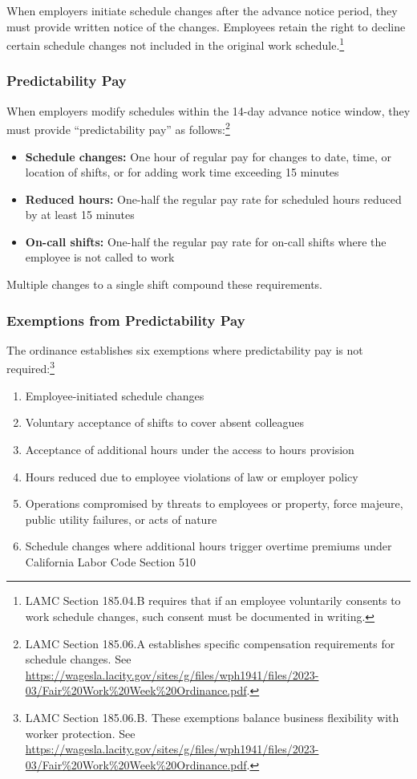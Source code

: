\documentclass[letterpaper,11pt,leqno]{article}
\theoremstyle{paper}
\begin{document}
When employers initiate schedule changes after the advance notice period, they must provide written notice of the changes. Employees retain the right to decline certain schedule changes not included in the original work schedule.\footnote{LAMC Section 185.04.B requires that if an employee voluntarily consents to work schedule changes, such consent must be documented in writing.}

\subsubsection{Predictability Pay}
When employers modify schedules within the 14-day advance notice window, they must provide ``predictability pay'' as follows:\footnote{LAMC Section 185.06.A establishes specific compensation requirements for schedule changes. See \url{https://wagesla.lacity.gov/sites/g/files/wph1941/files/2023-03/Fair\%20Work\%20Week\%20Ordinance.pdf}.}
\begin{itemize}
   \item \textbf{Schedule changes:} One hour of regular pay for changes to date, time, or location of shifts, or for adding work time exceeding 15 minutes
   \item \textbf{Reduced hours:} One-half the regular pay rate for scheduled hours reduced by at least 15 minutes
   \item \textbf{On-call shifts:} One-half the regular pay rate for on-call shifts where the employee is not called to work
\end{itemize}

Multiple changes to a single shift compound these requirements.

\subsubsection{Exemptions from Predictability Pay}
The ordinance establishes six exemptions where predictability pay is not required:\footnote{LAMC Section 185.06.B. These exemptions balance business flexibility with worker protection. See \url{https://wagesla.lacity.gov/sites/g/files/wph1941/files/2023-03/Fair\%20Work\%20Week\%20Ordinance.pdf}.}
\begin{enumerate}
   \item Employee-initiated schedule changes
   \item Voluntary acceptance of shifts to cover absent colleagues
   \item Acceptance of additional hours under the access to hours provision
   \item Hours reduced due to employee violations of law or employer policy
   \item Operations compromised by threats to employees or property, force majeure, public utility failures, or acts of nature
   \item Schedule changes where additional hours trigger overtime premiums under California Labor Code Section 510
\end{enumerate}
\end{document}
